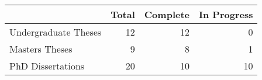 \begin{tabular}{lrrr}
\toprule
 & Total & Complete & In Progress \\
\midrule
Undergraduate Theses & 12 & 12 & 0 \\
Masters Theses & 9 & 8 & 1 \\
PhD Dissertations & 20 & 10 & 10 \\
\bottomrule
\end{tabular}
